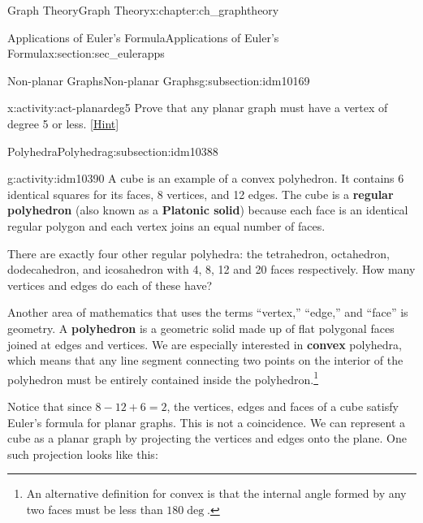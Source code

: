 \documentclass[oneside,10pt,]{book}
\newcommand{\terminology}[1]{\textbf{#1}}
\numberwithin{equation}{chapter}
\newcommand{\vtx}[2]{node[fill,circle,inner sep=0pt, minimum size=4pt,label=#1:#2]{}}
\renewcommand{\v}{\vtx{above}{}}
\begin{document}
\begin{chapterptx}{Graph Theory}{}{Graph Theory}{}{}{x:chapter:ch_graphtheory}
\begin{sectionptx}{Applications of Euler's Formula}{}{Applications of Euler's Formula}{}{}{x:section:sec_eulerapps}
\begin{subsectionptx}{Non-planar Graphs}{}{Non-planar Graphs}{}{}{g:subsection:idm10169}
\begin{activity}{}{x:activity:act-planardeg5}
Prove that any planar graph must have a vertex of degree 5 or less.%
\space\hspace*{0pt}\hfill{\tiny\hyperlink{g:hint:idm10379-back}{[Hint]}}\end{activity}
\end{subsectionptx}
%
%
\typeout{************************************************}
\typeout{************************************************}
%
\begin{subsectionptx}{Polyhedra}{}{Polyhedra}{}{}{g:subsection:idm10388}
\begin{activity}{}{g:activity:idm10390}%
A cube is an example of a convex polyhedron. It contains 6 identical squares for its faces, 8 vertices, and 12 edges. The cube is a \terminology{regular polyhedron} (also known as a \terminology{Platonic solid}) because each face is an identical regular polygon and each vertex joins an equal number of faces.%
\par
There are exactly four other regular polyhedra: the tetrahedron, octahedron, dodecahedron, and icosahedron with 4, 8, 12 and 20 faces respectively. How many vertices and edges do each of these have?%
\end{activity}
Another area of mathematics that uses the terms ``vertex,'' ``edge,'' and ``face'' is geometry. A \terminology{polyhedron} is a geometric solid made up of flat polygonal faces joined at edges and vertices. We are especially interested in \terminology{convex} polyhedra, which means that any line segment connecting two points on the interior of the polyhedron must be entirely contained inside the polyhedron.\footnote{An alternative definition for convex is that the internal angle formed by any two faces must be less than \(180\deg\).\label{g:fn:idm10410}}%
\par
Notice that since \(8 - 12 + 6 = 2\), the vertices, edges and faces of a cube satisfy Euler's formula for planar graphs. This is not a coincidence. We can represent a cube as a planar graph by projecting the vertices and edges onto the plane. One such projection looks like this:%
\begin{sidebyside}{1}{0.4}{0.4}{0}%
\begin{sbspanel}{0.2}%
\resizebox{\linewidth}{!}{%
\begin{tikzpicture}
  \foreach \ang in {45, 135, 225, 315} {
  \draw (\ang:.4) \v -- (\ang:1) \v -- (\ang+90:1) (\ang:.4) -- (\ang+90:.4);
  }
  \end{tikzpicture}
}
\end{sbspanel}
\end{sidebyside}
\end{subsectionptx}
\end{sectionptx}
\end{chapterptx}
\end{document}
